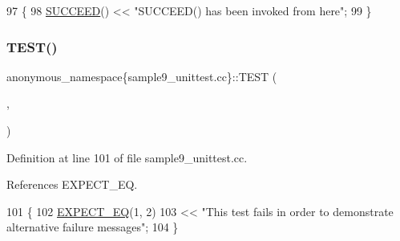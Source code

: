 \begin{DoxyCode}
97                                  \{
98   \hyperlink{gtest_8h_a75adcdf89f69b0b615e395daafc315af}{SUCCEED}() << \textcolor{stringliteral}{"SUCCEED() has been invoked from here"};
99 \}
\end{DoxyCode}
\mbox{\label{namespaceanonymous__namespace_02sample9__unittest_8cc_03_a3506d8abcde9c893d260ea1fb4370460}} 
\subsubsection{\texorpdfstring{T\+E\+S\+T()}{TEST()}\hspace{0.1cm}{\footnotesize\ttfamily [3/3]}}
{\footnotesize\ttfamily anonymous\+\_\+namespace\{sample9\+\_\+unittest.\+cc\}\+::T\+E\+ST (\begin{DoxyParamCaption}\item[{Custom\+Output\+Test}]{,  }\item[{Fails}]{ }\end{DoxyParamCaption})}



Definition at line 101 of file sample9\+\_\+unittest.\+cc.



References E\+X\+P\+E\+C\+T\+\_\+\+EQ.


\begin{DoxyCode}
101                               \{
102   \hyperlink{gtest_8h_a4159019abda84f5366acdb7604ff220a}{EXPECT\_EQ}(1, 2)
103       << \textcolor{stringliteral}{"This test fails in order to demonstrate alternative failure messages"};
104 \}
\end{DoxyCode}
